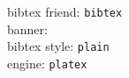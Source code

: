 \documentclass[autodetect-engine]{jsarticle}
\def\bibtex{bibtex}
\def\bst{plain}
\def\engine{uplatex}
\def\engine{platex}
\begin{document}
\parindent0pt

bibtex friend: \texttt{\bibtex}\\
%
\makeatletter
\ifx\banner\@undefined\else
 banner: \texttt{\banner}\\
\fi
\makeatother
%
bibtex style: \texttt{\bst}\\
engine: \texttt{\engine}

\vspace*{1em}

\nocite{*}


\end{document}
